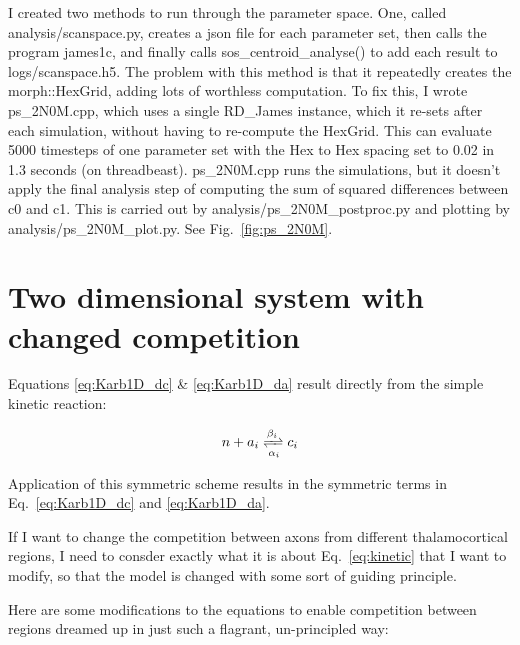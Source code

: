\documentclass[11pt, a4paper]{article}
\newcommand{\code}[1]{\textsf{#1}}
\begin{document}
I created two methods to run through the parameter space. One, called
\code{analysis/scanspace.py}, creates a json file for each parameter set, then
calls the program \code{james1c}, and finally
calls \code{sos\_centroid\_analyse()} to add each result
to \code{logs/scanspace.h5}. The problem with this method is that it
repeatedly creates the \code{morph::HexGrid}, adding lots of worthless
computation. To fix this, I wrote \code{ps\_2N0M.cpp}, which uses a
single \code{RD\_James} instance, which it re-sets after each
simulation, without having to re-compute the HexGrid. This can
evaluate 5000 timesteps of one parameter set with the Hex to Hex
spacing set to 0.02 in 1.3 seconds (on
threadbeast). \code{ps\_2N0M.cpp} runs the simulations, but it doesn't
apply the final analysis step of computing the sum of squared
differences between c0 and c1. This is carried out by
\code{analysis/ps\_2N0M\_postproc.py} and plotting by
\code{analysis/ps\_2N0M\_plot.py}. See Fig.~\ref{fig:ps_2N0M}.

\section{Two dimensional system with changed competition}

Equations \ref{eq:Karb1D_dc} \& \ref{eq:Karb1D_da} result directly
from the simple kinetic reaction:

\begin{equation} \label{eq:kinetic}
n + a_i \xrightleftharpoons[\alpha_{i}]{\beta_{i}} c_i
\end{equation}

Application of this symmetric scheme results in the symmetric terms in
Eq.~\ref{eq:Karb1D_dc} and \ref{eq:Karb1D_da}.

If I want to change the competition between axons from different
thalamocortical regions, I need to consder exactly what it is about
Eq.~\ref{eq:kinetic} that I want to modify, so that the model is
changed with some sort of guiding principle.

Here are some modifications to the equations to enable competition
between regions dreamed up in just such a flagrant, un-principled way:
\end{document}
